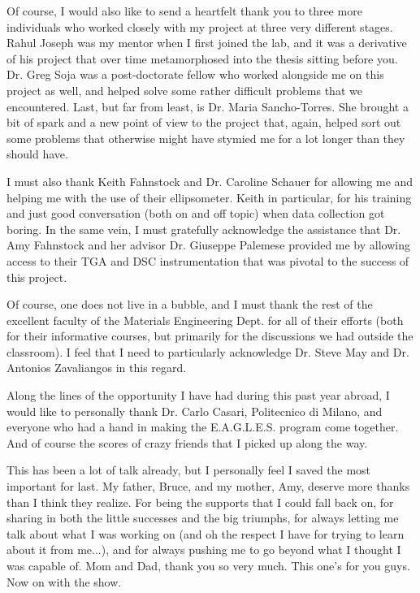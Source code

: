 Of course, I would also like to send a heartfelt thank you to three more individuals who worked closely with my project at three very different stages. Rahul Joseph was my mentor when I first joined the lab, and it was a derivative of his project that over time metamorphosed into the thesis sitting before you.  Dr. Greg Soja was a post-doctorate fellow who worked alongside me on this project as well, and helped solve some rather difficult problems that we encountered. Last, but far from least, is Dr. Maria Sancho-Torres. She brought a bit of spark and a new point of view to the project that, again, helped sort out some problems that otherwise might have stymied me for a lot longer than they should have. 

I must also thank Keith Fahnstock and Dr. Caroline Schauer for allowing me and helping me with the use of their ellipsometer. Keith in particular, for his training and just good conversation (both on and off topic) when data collection got boring. In the same vein, I must gratefully acknowledge the assistance that Dr. Amy Fahnstock and her advisor Dr. Giuseppe Palemese provided me by allowing access to their TGA and DSC instrumentation that was pivotal to the success of this project. 

Of course, one does not live in a bubble, and I must thank the rest of the excellent faculty of the Materials Engineering Dept. for all of their efforts (both for their informative courses, but primarily for the discussions we had outside the classroom). I feel that I need to particularly acknowledge Dr. Steve May and Dr. Antonios Zavaliangos in this regard. 

Along the lines of the opportunity I have had during this past year abroad, I would like to personally thank Dr. Carlo Casari, Politecnico di Milano, and everyone who had a hand in making the E.A.G.L.E.S. program come together. And of course the scores of crazy friends that I picked up along the way. 

This has been a lot of talk already, but I personally feel I saved the most important for last.  My father, Bruce, and my mother, Amy, deserve more thanks than I think they realize. For being the supports that I could fall back on, for sharing in both the little successes and the big triumphs, for always letting me talk about what I was working on (and oh the respect I have for trying to learn about it from me...), and for always pushing me to go beyond what I thought I was capable of. Mom and Dad, thank you so very much. This one's for you guys. Now on with the show. 











